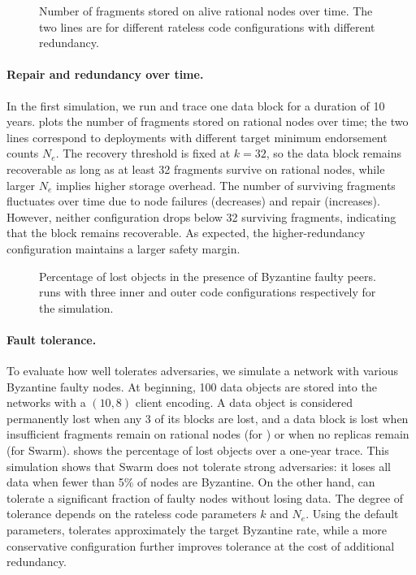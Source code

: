 \begin{figure}
    \caption{Number of fragments stored on alive \sys rational nodes over time.
    The two lines are for different rateless code configurations with different redundancy.}
    \ifacm{}\fi
    \label{fig:time}
\end{figure}

\paragraph{Repair and redundancy over time.}
In the first simulation, we run \sys and trace one data block for a duration of 10 years.
 plots the number of fragments stored on rational nodes over time; the two lines correspond to deployments with different target minimum endorsement counts $N_e$.
The recovery threshold is fixed at $k=32$, so the data block remains recoverable as long as at least 32 fragments survive on rational nodes, while larger $N_e$ implies higher storage overhead.
The number of surviving fragments fluctuates over time due to node failures (decreases) and repair (increases).
However, neither configuration drops below 32 surviving fragments, indicating that the block remains recoverable.
As expected, the higher-redundancy configuration maintains a larger safety margin.

\begin{figure}
    \caption{Percentage of lost objects in the presence of Byzantine faulty peers.
    \sys runs with three inner and outer code configurations respectively for the simulation.}
    \ifacm{}\fi
    \label{fig:faulty}
\end{figure}

\paragraph{Fault tolerance.}
To evaluate how well \sys tolerates adversaries, we simulate a network with various Byzantine faulty nodes.
At beginning, 100 data objects are stored into the networks with a $(10, 8)$ client encoding.
A data object is considered permanently lost when any 3 of its blocks are lost, and a data block is lost when insufficient fragments remain on rational nodes (for \sys) or when no replicas remain (for Swarm).
 shows the percentage of lost objects over a one-year trace.
This simulation shows that Swarm does not tolerate strong adversaries: it loses all data when fewer than 5\% of nodes are Byzantine.
On the other hand, \sys can tolerate a significant fraction of faulty nodes without losing data.
The degree of tolerance depends on the rateless code parameters $k$ and $N_e$.
Using the default parameters, \sys tolerates approximately the target  Byzantine rate, while a more conservative configuration further improves tolerance at the cost of additional redundancy.

